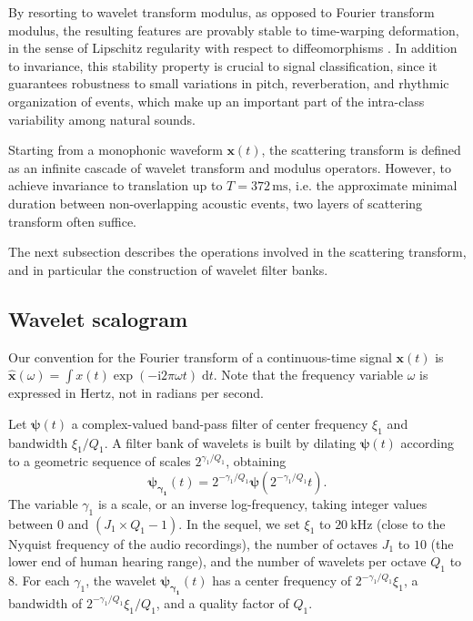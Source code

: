 \documentclass[journal]{IEEEtran}
\makeatletter
\newcommand*{\ie}{i.e.\@\xspace}
\makeatother
\begin{document}
By resorting to wavelet transform modulus, as opposed to Fourier transform modulus, the resulting features are provably stable to time-warping deformation,
in the sense of Lipschitz regularity with respect to diffeomorphisms \cite{Mallat2012}.
In addition to invariance, this stability property is crucial to signal classification, since it guarantees robustness to small variations in pitch, reverberation, and rhythmic organization of events, which make up an important part of the intra-class variability among natural sounds.

Starting from a monophonic waveform $\boldsymbol{x}(t)$, the scattering transform is defined as an infinite cascade of wavelet transform and modulus operators.
However, to achieve invariance to translation up to $T = 372\,\mathrm{ms}$, \ie the approximate minimal duration between non-overlapping acoustic events, two layers of scattering transform often suffice.

The next subsection describes the operations involved in the scattering transform, and in particular the construction of wavelet filter banks.

\subsection{Wavelet scalogram}
Our convention for the Fourier transform of a continuous-time signal $\boldsymbol{x}(t)$ is $\boldsymbol{\hat{x}}(\omega) = \int x(t) \exp(- \mathrm{i} 2\pi \omega t) \; \mathrm{d}t$. Note that the frequency variable $\omega$ is expressed in Hertz, not in radians per second.

Let $\boldsymbol{\psi}(t)$ a complex-valued band-pass filter of
center frequency $\xi_1$ and bandwidth $\xi_1/Q_1$.
A filter bank of wavelets is built by dilating $\boldsymbol{\psi}(t)$
according to a geometric sequence of scales $2^{\gamma_1/Q_1}$, obtaining
\begin{equation}
\boldsymbol{\psi_{\gamma_1}}(t) = 2^{-\gamma_1/Q_1} \boldsymbol{\psi}(2^{-\gamma_1/Q_1} t)\mbox{.}
\end{equation}
The variable $\gamma_1$ is a scale, or an inverse log-frequency, taking integer values between $0$ and $(J_1 \times Q_1 - 1)$.
In the sequel, we set $\xi_1$ to $20~\mathrm{kHz}$ (close to the Nyquist frequency of the audio recordings), the number of octaves $J_1$ to $10$ (the lower end of human hearing range), and the number of wavelets per octave $Q_1$ to $8$.
For each $\gamma_1$, the wavelet $\boldsymbol{\psi_{\gamma_1}}(t)$
has a center frequency of $2^{-\gamma_1/Q_1}\xi_1$, a bandwidth of $2^{-\gamma_1/Q_1}\xi_1/Q_1$, and a quality factor of $Q_1$.
\end{document}

